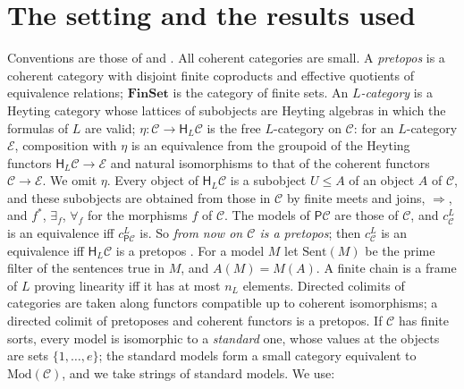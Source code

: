 \documentclass[11pt]{amsart}
\theoremstyle{definition}
\newcommand{\Fin}{\mathbf{FinSet}}
\newcommand{\Mod}{\mathrm{Mod}}
\newcommand{\Sent}{\mathrm{Sent}}
\newcommand{\PP}{\mathsf P}
\newcommand{\HH}{\mathsf H}
\newcommand{\cC}{\mathcal C}
\newcommand{\cE}{\mathcal E}
\begin{document}
\section{The setting and the results used}\label{sec:setting}

Conventions are those of \cite{Finsorts} and \cite{Proftrees}. All
coherent categories are small. A \emph{pretopos} is a coherent
category with disjoint finite coproducts and effective quotients of
equivalence relations; $\Fin$ is the category of finite sets. An
\emph{$L$-category} is a Heyting category whose lattices of subobjects
are Heyting algebras in which the formulas of $L$ are valid;
$\eta\colon\cC\to\HH_L\cC$ is the free $L$-category on $\cC$: for an
$L$-category $\cE$, composition with $\eta$ is an equivalence from the
groupoid of the Heyting functors $\HH_L\cC\to\cE$ and natural
isomorphisms to that of the coherent functors $\cC\to\cE$. We omit
$\eta$. Every object of $\HH_L\cC$ is a subobject $U\le A$ of an
object $A$ of $\cC$, and these subobjects are obtained from those in
$\cC$ by finite meets and joins, $\Rightarrow$, and $f^*$,
$\exists_f$, $\forall_f$ for the morphisms $f$ of $\cC$. The models of
$\PP\cC$ are those of $\cC$, and $c^L_\cC$ is an equivalence iff
$c^L_{\PP\cC}$ is. So \emph{from now on $\cC$ is a pretopos}; then
$c^L_\cC$ is an equivalence iff $\HH_L\cC$ is a pretopos
\cite[Lemma~2.2]{Interm}. For a model $M$ let $\Sent(M)$ be the prime
filter of the sentences true in $M$, and $A(M)=M(A)$. A finite chain
is a frame of $L$ proving linearity iff it has at most $n_L$ elements.
Directed colimits of categories are taken along functors compatible up
to coherent isomorphisms; a directed colimit of pretoposes and
coherent functors is a pretopos. If $\cC$ has finite sorts, every
model is isomorphic to a \emph{standard} one, whose values at the
objects are sets $\{1,\dots,e\}$; the standard models form a small
category equivalent to $\Mod(\cC)$, and we take strings of standard
models. We use:
\end{document}
